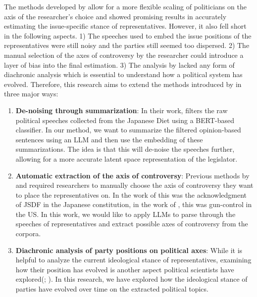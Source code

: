\documentclass[final,5p,times,twocolumn,authoryear]{elsarticle}
\begin{document}
The methods developed by \citeauthor{kato2024lupinllmbasedpoliticalideology} allow for a more flexible scaling of politicians on the axis of the researcher's choice and showed promising results in accurately estimating the issue-specific stance of representatives. However, it also fell short in the following aspects. 1) The speeches used to embed the issue positions of the representatives were still noisy and the parties still seemed too dispersed. 2) The manual selection of the axes of controversy by the researcher could introduce a layer of bias into the final estimation. 3) The analysis by \citeauthor{kato2024lupinllmbasedpoliticalideology} lacked any form of diachronic analysis which is essential to understand how a political system has evolved. Therefore, this research aims to extend the methods introduced by \citeauthor{kato2024lupinllmbasedpoliticalideology} in three major ways: 
\begin{enumerate}
    \item \textbf{De-noising through summarization}: In their work, \citeauthor{kato2024lupinllmbasedpoliticalideology} filters the raw political speeches collected from the Japanese Diet using a BERT-based classifier. In our method, we want to summarize the filtered opinion-based sentences using an LLM and then use the embedding of these summarizations. The idea is that this will de-noise the speeches further, allowing for a more accurate latent space representation of the legislator. 
    \item \textbf{Automatic extraction of the axis of controversy}: Previous methods by \citeauthor{kato2024lupinllmbasedpoliticalideology} and \citeauthor{llm-latent-position-of-politicians} required researchers to manually choose the axis of controversy they want to place the representatives on. In the work of \citeauthor{kato2024lupinllmbasedpoliticalideology} this was the acknowledgment of JSDF in the Japanese constitution, in the work of \citeauthor{llm-latent-position-of-politicians}, this was gun-control in the US. In this work, we would like to apply LLMs to parse through the speeches of representatives and extract possible axes of controversy from the corpora. 
    \item \textbf{Diachronic analysis of party positions on political axes}: While it is helpful to analyze the current ideological stance of representatives, examining how their position has evolved is another aspect political scientists have explored(\cite{Debating-Evil:-Using-Word-Embeddings-to-Analyze-Parliamentary-Debates}; \cite{Word-embeddings-for-analysis-of-ideological-placement}). In this research, we have explored how the ideological stance of parties have evolved over time on the extracted political topics. 
\end{enumerate}
\end{document}
